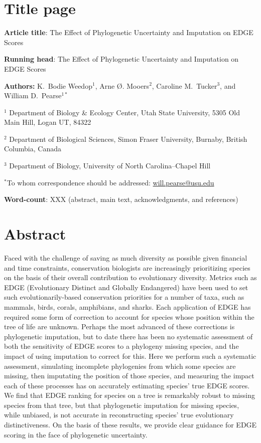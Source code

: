 \documentclass[10pt,english]{article}
\begin{document}
\setlength{\parindent}{0pt}
\section*{Title page}

\textbf{Article title}: The Effect of Phylogenetic Uncertainty and Imputation on EDGE Scores

\textbf{Running head}: The Effect of Phylogenetic Uncertainty and Imputation on EDGE Scores

\textbf{Authors:} K.\ Bodie Weedop$^{1}$, Arne \O. Mooers$^2$, Caroline M.\ Tucker$^3$, and William D.\ Pearse$^{1*}$\

$^1$ Department of Biology \& Ecology Center, Utah State University,
5305 Old Main Hill, Logan UT, 84322

$^2$ Department of Biological Sciences, Simon Fraser University, Burnaby,
British Columbia, Canada

$^3$ Department of Biology, University of North Carolina–Chapel Hill

$^*$To whom correspondence should be addressed:
\url{will.pearse@usu.edu}

\textbf{Word-count}: XXX (abstract, main text, acknowledgments, and
  references)

\clearpage
\section*{Abstract}

Faced with the challenge of saving as much diversity as possible given financial
and time constraints, conservation biologists are increasingly prioritizing
species on the basis of their overall contribution to evolutionary diversity.
Metrics such as EDGE (Evolutionary Distinct and Globally Endangered) have been
used to set such evolutionarily-based conservation priorities for a number of
taxa, such as mammals, birds, corals, amphibians, and sharks. Each application
of EDGE has required some form of correction to account for species whose
position within the tree of life are unknown. Perhaps the most advanced of these
corrections is phylogenetic imputation, but to date there has been no systematic
assessment of both the sensitivity of EDGE scores to a phylogeny missing
species, and the impact of  using imputation to correct for this. Here we
perform such a systematic assessment, simulating incomplete phylogenies from
which some species are missing, then imputating the position of those species,
and measuring the impact each of these processes has on accurately estimating
species’ true EDGE scores. We find that EDGE ranking for species on a tree is
remarkably robust to missing species from that tree, but  that phylogenetic
imputation for missing species, while unbiased, is not accurate in
reconstructing species’ true evolutionary distinctiveness. On the basis of these
results, we provide clear guidance for EDGE scoring in the face of phylogenetic
uncertainty.
\end{document}
